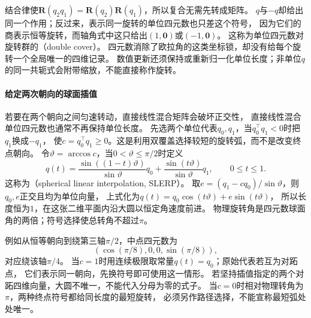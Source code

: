 结合律使$\bm R(q_2q_1)=\bm R(q_2)\bm R(q_1)$，所以复合无需先转成矩阵。
$q$与$-q$却给出同一个作用；反过来，表示同一旋转的单位四元数也只差这个符号，
因为它们的商表示恒等旋转，而轴角式中这只给出$(1,\bm0)$或$(-1,\bm0)$。
这称为单位四元数对旋转群的（double cover）。
四元数消除了欧拉角的这类坐标锁，却没有给每个旋转一个全局唯一的四维记录。
数值更新还须保持或重新归一化单位长度；非单位$q$的同一共轭式会附带缩放，不能直接称作旋转。

\paragraph{给定两次朝向的球面插值}
若要在两个朝向之间匀速转动，直接线性混合矩阵会破坏正交性，
直接线性混合单位四元数也通常不再保持单位长度。
先选两个单位代表$q_0,q_1$，当$q_0^\top q_1<0$时把$q_1$换成$-q_1$，
使$c=q_0^\top q_1\geq0$。这是利用双覆盖选择较短的旋转弧，而不是改变终点朝向。
令$\vartheta=\arccos c$，当$0<\vartheta\leq\pi/2$时定义
\begin{equation}
 q(t)=\frac{\sin((1-t)\vartheta)}{\sin\vartheta}q_0
       +\frac{\sin(t\vartheta)}{\sin\vartheta}q_1,
 \qquad 0\leq t\leq1.
 \label{eq:geometry-quaternion-slerp}
\end{equation}
这称为（spherical linear interpolation, SLERP）。
取$e=(q_1-cq_0)/\sin\vartheta$，则$q_0,e$正交且均为单位向量，
上式化为$q(t)=q_0\cos(t\vartheta)+e\sin(t\vartheta)$，
所以长度恒为$1$，在这张二维平面内沿大圆以恒定角速度前进。
物理旋转角是四元数球面角的两倍；符号选择使总转角不超过$\pi$。

例如从恒等朝向到绕第三轴$\pi/2$，中点四元数为
\[
 (\cos(\pi/8),0,0,\sin(\pi/8)),
\]
对应绕该轴$\pi/4$。
当$c=1$时用连续极限取常量$q(t)=q_0$；原始代表若互为对跖点，
它们表示同一朝向，先换符号即可使用这一情形。
若坚持插值指定的两个对跖四维向量，大圆不唯一，不能代入分母为零的式子。
当$c=0$时相对物理转角为$\pi$，两种终点符号都给同长度的最短旋转，
必须另作路径选择，不能宣称最短弧处处唯一。

